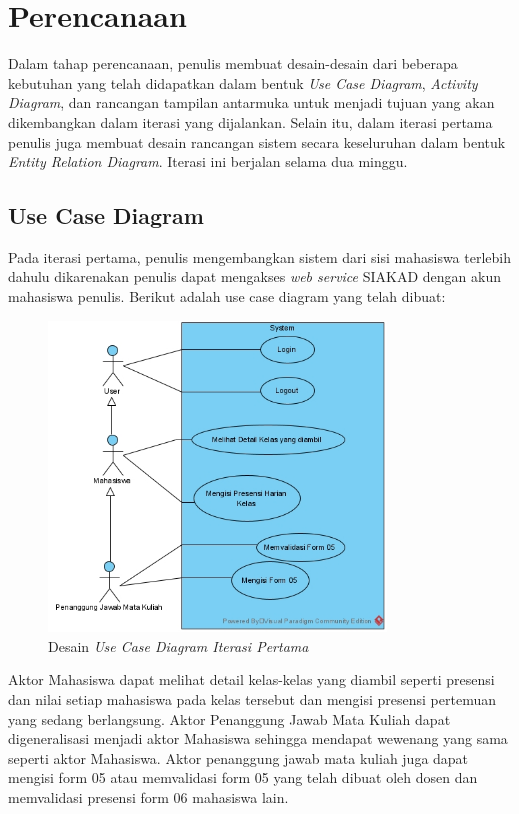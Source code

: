 \section{Perencanaan}

Dalam tahap perencanaan, penulis membuat desain-desain dari beberapa kebutuhan yang telah didapatkan dalam bentuk \textit{Use Case Diagram}, \textit{Activity Diagram}, dan rancangan tampilan antarmuka untuk menjadi tujuan yang akan dikembangkan dalam iterasi yang dijalankan. Selain itu, dalam iterasi pertama penulis juga membuat desain rancangan sistem secara keseluruhan dalam bentuk \textit{Entity Relation Diagram}. Iterasi ini berjalan selama dua minggu.

\subsection{Use Case Diagram}

Pada iterasi pertama, penulis mengembangkan sistem dari sisi mahasiswa terlebih dahulu dikarenakan penulis dapat mengakses \textit{web service} SIAKAD dengan akun mahasiswa penulis. Berikut adalah use case diagram yang telah dibuat:

\begin{figure}[H]
	\centering
	\includegraphics[width=0.8\textwidth]{gambar/diagram/Use Case Iteration 1}
	\caption{Desain \textit{Use Case Diagram Iterasi Pertama}}
	\label{fig:usecase1st}
\end{figure}

Aktor Mahasiswa dapat melihat detail kelas-kelas yang diambil seperti presensi dan nilai setiap mahasiswa pada kelas tersebut dan mengisi presensi pertemuan yang sedang berlangsung.
Aktor Penanggung Jawab Mata Kuliah dapat digeneralisasi menjadi aktor Mahasiswa sehingga mendapat wewenang yang sama seperti aktor Mahasiswa. Aktor penanggung jawab mata kuliah juga dapat mengisi form 05 atau memvalidasi form 05 yang telah dibuat oleh dosen dan memvalidasi presensi form 06 mahasiswa lain.

